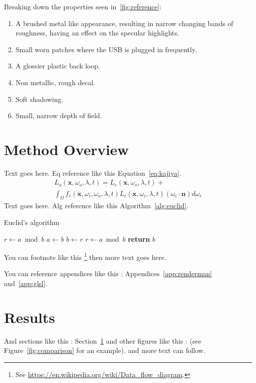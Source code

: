 \documentclass[]{acmsiggraph}
\begin{document}
Breaking down the properties seen in~\ref{fig:reference}:
\begin{enumerate}
 \item A brushed metal like appearance, resulting in narrow changing bands of roughness, having an effect on the specular highlights.
 \item Small worn patches where the USB is plugged in frequently.
 \item A glossier plastic back loop.
 \item Non metallic, rough decal.
 \item Soft shadowing.
 \item Small, narrow depth of field.
\end{enumerate}


\section{Method Overview} \label{sec:overview}
Text goes here. Eq reference like this Equation~\ref{eq:kajiya}.
\begin{multline}\label{eq:kajiya}
L_o \left( \mathbf{x},\omega_o,\lambda,t \right) = L_e\left(\mathbf{x},\omega_o,\lambda,t \right) + \\
   \int_\Omega f_r \left(\mathbf{x},\omega_i,\omega_o,\lambda,t\right) L_i\left(\mathbf{x},\omega_i,\lambda,t\right) \left(\omega_i \cdot \mathbf{n}\right) d\omega_i
\end{multline}
Text goes here. Alg reference like this Algorithm~\ref{alg:euclid}. 
\begin{algorithm}
\caption{Euclid’s algorithm}\label{alg:euclid}
\begin{algorithmic}[1]
\State $r\gets a\bmod b$
\State $a\gets b$
\State $b\gets r$
\State $r\gets a\bmod b$
\EndWhile\label{euclidendwhile}
\State \textbf{return} $b$
\EndProcedure
\end{algorithmic}
\end{algorithm}
You can footnote like this \footnote{See \url{https://en.wikipedia.org/wiki/Data_flow_diagram}.} then more text goes here.

You can reference appendices like this : Appendices~\ref{app:renderman} and~\ref{app:glsl}.

\section{Results} \label{sec:results}
And sections like this : Section~\ref{sec:overview} and other figures like this : (see Figure~\ref{fig:comparison} for an example). and more text can follow.
\end{document}
